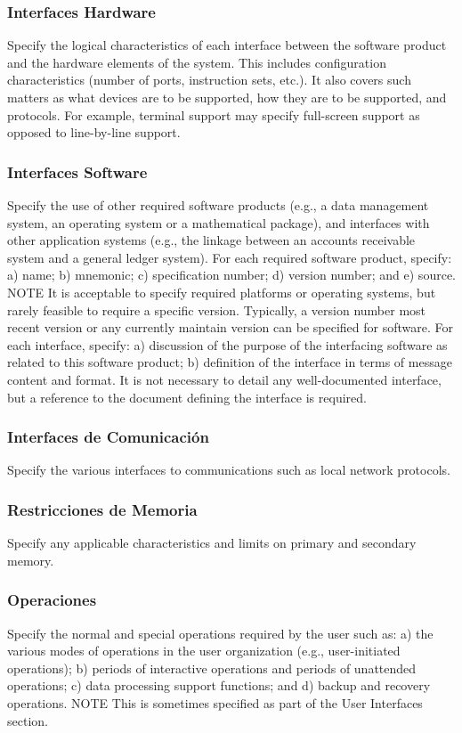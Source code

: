 \documentclass[12pt, a4paper, twoside]{article}
\begin{document}
 \subsubsection{Interfaces Hardware}
 Specify the logical characteristics of each interface between the software product and the hardware
 elements of the system. This includes configuration characteristics (number of ports, instruction sets,
 etc.). It also covers such matters as what devices are to be supported, how they are to be supported, and
 protocols. For example, terminal support may specify full-screen support as opposed to line-by-line
 support.

 \subsubsection{Interfaces Software}
 Specify the use of other required software products (e.g., a data management system, an operating
 system or a mathematical package), and interfaces with other application systems (e.g., the linkage
 between an accounts receivable system and a general ledger system).
 For each required software product, specify:
 a) name;
 b) mnemonic;
 c) specification number;
 d) version number; and
 e) source.
 NOTE It is acceptable to specify required platforms or operating systems, but rarely feasible to require a
 specific version. Typically, a version number most recent version or any currently maintain version can be
 specified for software.
 For each interface, specify:
 a) discussion of the purpose of the interfacing software as related to this software product;
 b) definition of the interface in terms of message content and format. It is not necessary to detail any
 well-documented interface, but a reference to the document defining the interface is required.

 \subsubsection{Interfaces de Comunicación}
 Specify the various interfaces to communications such as local network protocols.

 \subsubsection{Restricciones de Memoria}
 Specify any applicable characteristics and limits on primary and secondary memory.

 \subsubsection{Operaciones}
 Specify the normal and special operations required by the user such as:
 a) the various modes of operations in the user organization (e.g., user-initiated operations);
 b) periods of interactive operations and periods of unattended operations;
 c) data processing support functions; and
 d) backup and recovery operations.
 NOTE This is sometimes specified as part of the User Interfaces section.
\end{document}
